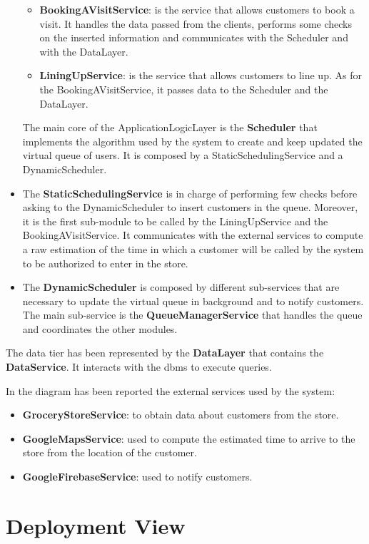\begin{itemize}
\begin{itemize}
			\item \textbf{BookingAVisitService}: is the service that allows customers to book a visit. It handles the data passed from the clients, performs some checks on the inserted information and communicates with the Scheduler and with the DataLayer.
			\item \textbf{LiningUpService}: is the service that allows customers to line up. As for the BookingAVisitService, it passes data to the Scheduler and the DataLayer.
		\end{itemize}
		
		The main core of the ApplicationLogicLayer is the \textbf{Scheduler} that implements the algorithm used by the system to create and keep updated the virtual queue of users. It is composed by a StaticSchedulingService and a DynamicScheduler.
		\item The \textbf{StaticSchedulingService} is in charge of performing few checks before asking to the DynamicScheduler to insert customers in the queue. Moreover, it is the first sub-module to be called by the LiningUpService and the BookingAVisitService. It communicates with the external services to compute a raw estimation of the time in which a customer will be called by the system to be authorized to enter in the store.
		\item The \textbf{DynamicScheduler} is composed by different sub-services that are necessary to update the virtual queue in background and to notify customers.
		The main sub-service is the \textbf{QueueManagerService} that handles the queue and coordinates the other modules.
\end{itemize}

The data tier has been represented by the \textbf{DataLayer} that contains the \textbf{DataService}. It interacts with the \gls{dbms} to execute queries.

In the diagram has been reported the external services used by the system:
\begin{itemize}
	\item \textbf{GroceryStoreService}: to obtain data about customers from the store.
	\item \textbf{GoogleMapsService}: used to compute the estimated time to arrive to the store from the location of the customer.
	\item \textbf{GoogleFirebaseService}: used to notify customers.
\end{itemize}


\section{Deployment View}

